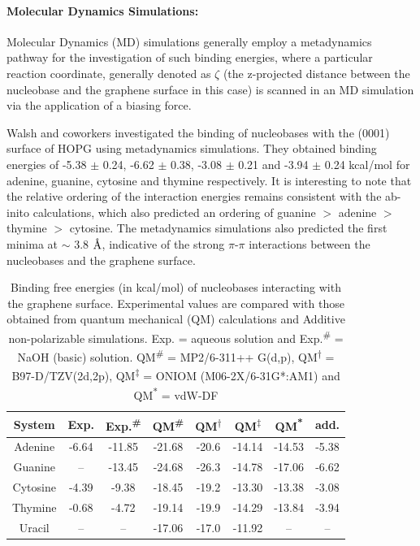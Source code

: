 \paragraph{Molecular Dynamics Simulations:} Molecular Dynamics (MD) simulations generally employ a metadynamics pathway for the investigation of such binding energies, where a particular reaction coordinate, generally denoted as $\zeta$ (the z-projected distance between the nucleobase and the graphene surface in this case) is scanned in an MD simulation via the application of a biasing force.

Walsh and coworkers investigated the binding of nucleobases with the (0001) surface of HOPG using metadynamics simulations.\supercite{hughes_adsorption_2017} They obtained binding energies of -5.38 $\pm$ 0.24, -6.62 $\pm$ 0.38, -3.08 $\pm$ 0.21 and  -3.94 $\pm$ 0.24 kcal/mol for adenine, guanine, cytosine and thymine respectively. It is interesting to note that the relative ordering of the interaction energies remains consistent with the ab-inito calculations, which also predicted an ordering of guanine $>$ adenine $>$ thymine $>$ cytosine. The metadynamics simulations also predicted the first minima at $\sim$ 3.8 $\text{\normalfont\AA}$, indicative of the strong $\pi$-$\pi$ interactions between the nucleobases and the graphene surface.

\begin{table}
    \centering
    \caption[Binding free energies (in kcal/mol) of nucleobases interacting with the graphene surface]{Binding free energies (in kcal/mol) of nucleobases interacting with the graphene surface. Experimental values are compared with those obtained from quantum mechanical (QM) calculations and Additive non-polarizable simulations. Exp. = aqueous solution and Exp.\textsuperscript{\#} = NaOH (basic) solution. QM\textsuperscript{\#} = MP2/6-311++ G(d,p), QM\textsuperscript{$\dag$} = B97-D/TZV(2d,2p), QM\textsuperscript{$\ddag$} = ONIOM (M06-2X/6-31G*:AM1) and QM\textsuperscript{*} = vdW-DF
    }
    \label{tbl:example1}
    \begin{tabular}{@{}cccccccc@{}}
        \toprule
        System & Exp.\supercite{varghese_binding_2009} & Exp.\textsuperscript{\#}\supercite{varghese_binding_2009} & QM\textsuperscript{\#}\supercite{gowtham_physisorption_2007} & QM\textsuperscript{$\dag$}\supercite{antony_structures_2008} & QM\textsuperscript{$\ddag$}\supercite{umadevi_quantum_2011} & QM\textsuperscript{*}\supercite{cho_noncovalent_2013} & add. \supercite{hughes_adsorption_2017} \\ \midrule
        Adenine & -6.64 & -11.85 & -21.68 & -20.6 & -14.14 & -14.53 & -5.38 \\
        Guanine & -- & -13.45 & -24.68 & -26.3 & -14.78 & -17.06 & -6.62 \\
        Cytosine & -4.39 & -9.38 & -18.45 & -19.2 & -13.30 & -13.38 & -3.08 \\
        Thymine & -0.68 & -4.72 & -19.14 & -19.9 & -14.29 & -13.84 & -3.94 \\
        Uracil & -- & -- & -17.06 & -17.0 & -11.92 & -- & -- \\ \bottomrule
        \end{tabular}
    \end{table}    

